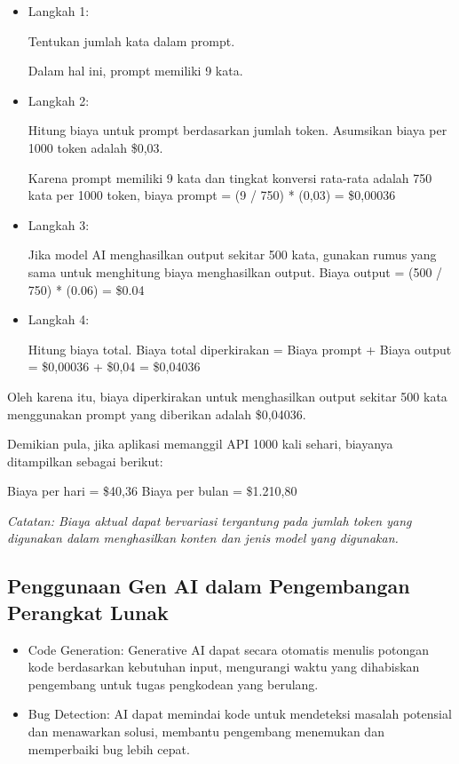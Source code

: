 \documentclass{article}
\begin{document}
\begin{itemize}
    \item Langkah 1:

          Tentukan jumlah kata dalam prompt.

          Dalam hal ini, prompt memiliki 9 kata.

    \item Langkah 2:

          Hitung biaya untuk prompt berdasarkan jumlah token. Asumsikan biaya per 1000 token adalah \$0,03.

          Karena prompt memiliki 9 kata dan tingkat konversi rata-rata adalah 750 kata per 1000 token, biaya prompt = (9 / 750) * (0,03) = \$0,00036

    \item Langkah 3:

          Jika model AI menghasilkan output sekitar 500 kata, gunakan rumus yang sama untuk menghitung biaya menghasilkan output. Biaya output = (500 / 750) * (0.06) = \$0.04

    \item Langkah 4:

          Hitung biaya total. Biaya total diperkirakan = Biaya prompt + Biaya output = \$0,00036 + \$0,04 = \$0,04036
\end{itemize}

Oleh karena itu, biaya diperkirakan untuk menghasilkan output sekitar 500 kata menggunakan prompt yang diberikan adalah \$0,04036.

Demikian pula, jika aplikasi memanggil API 1000 kali sehari, biayanya ditampilkan sebagai berikut:

Biaya per hari = \$40,36
Biaya per bulan = \$1.210,80

\textit{Catatan: Biaya aktual dapat bervariasi tergantung pada jumlah token yang digunakan dalam menghasilkan konten dan jenis model yang digunakan.}

\subsection{Penggunaan Gen AI dalam Pengembangan Perangkat Lunak}
\begin{itemize}
    \item Code Generation: Generative AI dapat secara otomatis menulis potongan kode berdasarkan kebutuhan input, mengurangi waktu yang dihabiskan pengembang untuk tugas pengkodean yang berulang.
    \item Bug Detection: AI dapat memindai kode untuk mendeteksi masalah potensial dan menawarkan solusi, membantu pengembang menemukan dan memperbaiki bug lebih cepat.
\end{itemize}
\end{document}
